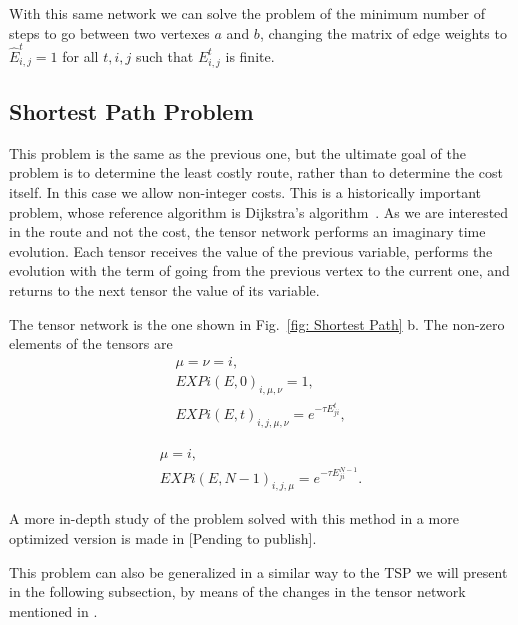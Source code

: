 With this same network we can solve the problem of the minimum number of steps to go between two vertexes $a$ and $b$, changing the matrix of edge weights to $\hat{E}^t_{i,j}=1$ for all $t,i,j$ such that $E^t_{i,j}$ is finite.

\subsection{Shortest Path Problem}
This problem is the same as the previous one, but the ultimate goal of the problem is to determine the least costly route, rather than to determine the cost itself. In this case we allow non-integer costs. This is a historically important problem, whose reference algorithm is Dijkstra's algorithm~\cite{Dijkstra1959}. As we are interested in the route and not the cost, the tensor network performs an imaginary time evolution. Each tensor receives the value of the previous variable, performs the evolution with the term of going from the previous vertex to the current one, and returns to the next tensor the value of its variable.

The tensor network is the one shown in Fig.~\ref{fig: Shortest Path} b. The non-zero elements of the tensors are 
\begin{equation}
     \begin{gathered}
         \mu=\nu=i,\\
         EXPi(E,0)_{i,\mu,\nu} = 1,\\
         EXPi(E,t)_{i,j,\mu,\nu} = e^{-\tau E^t_{ji}},
     \end{gathered}
\end{equation}

\begin{equation}
     \begin{gathered}
         \mu=i,\\
         EXPi(E,N-1)_{i,j,\mu} = e^{-\tau E^{N-1}_{ji}}.
     \end{gathered}
\end{equation}

A more in-depth study of the problem solved with this method in a more optimized version is made in {\color{red} [Pending to publish]}.

This problem can also be generalized in a similar way to the TSP we will present in the following subsection, by means of the changes in the tensor network mentioned in \cite{TSP_TN}.

